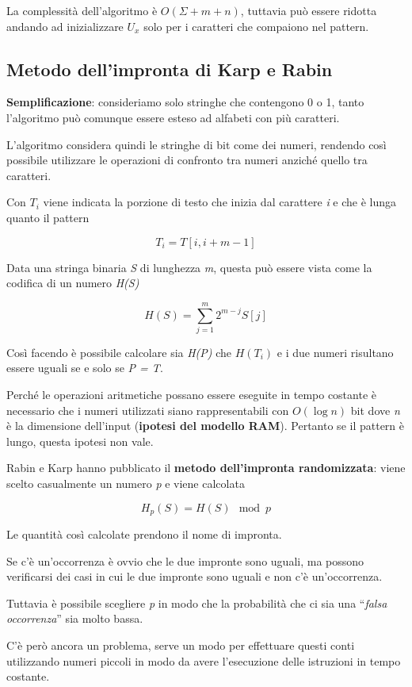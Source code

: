 La complessità dell'algoritmo è $O(\Sigma + m + n)$, tuttavia può essere ridotta andando ad inizializzare $U_x$ solo
per i caratteri che compaiono nel pattern.

\subsection{Metodo dell'impronta di Karp e Rabin}\label{metodo-dellimpronta-di-karp-e-rabin}

\textbf{Semplificazione}: consideriamo solo stringhe che contengono 0 o
1, tanto l'algoritmo può comunque essere esteso ad alfabeti con più
caratteri.

L'algoritmo considera quindi le stringhe di bit come dei numeri,
rendendo così possibile utilizzare le operazioni di confronto tra numeri
anziché quello tra caratteri.

Con $T_i$ viene indicata la porzione di testo che inizia dal
carattere \emph{i} e che è lunga quanto il pattern

$$
T_i = T[i, i + m -1]
$$

Data una stringa binaria \emph{S} di lunghezza \emph{m}, questa può
essere vista come la codifica di un numero \emph{H(S)}

$$
H(S) = \sum\limits_{j = 1}^m 2^{m-j}S[j]
$$

Così facendo è possibile calcolare sia \emph{H(P)} che $H(T_i)$ e
i due numeri risultano essere uguali se e solo se \emph{P = T}.

Perché le operazioni aritmetiche possano essere eseguite in tempo
costante è necessario che i numeri utilizzati siano rappresentabili con
$O(\log n)$ bit dove \emph{n} è la dimensione dell'input
(\textbf{ipotesi del modello RAM}). Pertanto se il pattern è lungo,
questa ipotesi non vale.

Rabin e Karp hanno pubblicato il \textbf{metodo dell'impronta
randomizzata}: viene scelto casualmente un numero \emph{p} e viene
calcolata

$$H_p(S) = H(S) \mod p$$

Le quantità così calcolate prendono il nome di impronta.

Se c'è un'occorrenza è ovvio che le due impronte sono uguali, ma possono
verificarsi dei casi in cui le due impronte sono uguali e non c'è
un'occorrenza. 

Tuttavia è possibile scegliere \emph{p} in modo che la
probabilità che ci sia una ``\emph{falsa occorrenza}'' sia molto bassa.

C'è però ancora un problema, serve un modo per effettuare questi conti
utilizzando numeri piccoli in modo da avere l'esecuzione delle
istruzioni in tempo costante.

